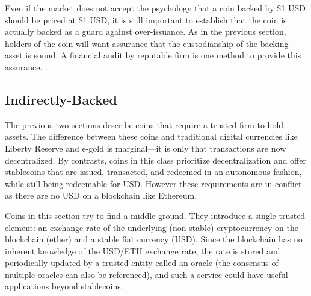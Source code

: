 
Even if the market does not accept the psychology that a coin backed by \$1 USD should be priced at \$1 USD, it is still important to establish that the coin is actually backed as a guard against over-issuance. As in the previous section, holders of the coin will want assurance that the custodianship of the backing asset is sound. A financial audit by reputable firm is one method to provide this assurance. .





\subsection{Indirectly-Backed}
\label{sec:dai}

The previous two sections describe coins that require a trusted firm to hold assets. The difference between these coins and traditional digital currencies like Liberty Reserve and e-gold is marginal---it is only that transactions are now decentralized. By contrasts, coins in this class prioritize decentralization and offer stablecoins that are issued, transacted, and redeemed in an autonomous fashion, while still being redeemable for USD. However these requirements are in conflict as there are no USD on a blockchain like Ethereum.

Coins in this section try to find a middle-ground. They introduce a single trusted element: an exchange rate of the underlying (non-stable) cryptocurrency on the blockchain (\eg ether) and a stable fiat currency (\eg USD). Since the blockchain has no inherent knowledge of the USD/ETH exchange rate, the rate is stored and periodically updated by a trusted entity called an oracle (the consensus of multiple oracles can also be referenced), and such a service could have useful applications beyond stablecoins.

